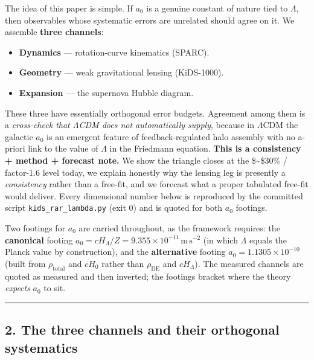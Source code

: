 \documentclass[
]{article}
\providecommand{\tightlist}{%
  \setlength{\itemsep}{0pt}\setlength{\parskip}{0pt}}
\begin{document}
The idea of this paper is simple. If \(a_0\) is a genuine constant of
nature tied to \(\Lambda\), then observables whose systematic errors are
unrelated should agree on it. We assemble \textbf{three channels}:

\begin{itemize}
\tightlist
\item
  \textbf{Dynamics} --- rotation-curve kinematics (SPARC).
\item
  \textbf{Geometry} --- weak gravitational lensing (KiDS-1000).
\item
  \textbf{Expansion} --- the supernova Hubble diagram.
\end{itemize}

These three have essentially orthogonal error budgets. Agreement among
them is a \emph{cross-check that \(\Lambda\)CDM does not automatically
supply}, because in \(\Lambda\)CDM the galactic \(a_0\) is an emergent
feature of feedback-regulated halo assembly with no a-priori link to the
value of \(\Lambda\) in the Friedmann equation. \textbf{This is a
consistency + method + forecast note.} We show the triangle closes at
the \$\sim\$30\% / factor-1.6 level today, we explain honestly why the
lensing leg is presently a \emph{consistency} rather than a free-fit,
and we forecast what a proper tabulated free-fit would deliver. Every
dimensional number below is reproduced by the committed script
\texttt{kids\_rar\_lambda.py} (exit 0) and is quoted for both \(a_0\)
footings.

Two footings for \(a_0\) are carried throughout, as the framework
requires: the \textbf{canonical} footing
\(a_0 = cH_\Lambda/Z = 9.355\times10^{-11}\,\mathrm{m\,s^{-2}}\) (in
which \(\Lambda\) equals the Planck value by construction), and the
\textbf{alternative} footing \(a_0 = 1.1305\times10^{-10}\) (built from
\(\rho_\mathrm{total}\) and \(cH_0\) rather than \(\rho_\mathrm{DE}\) and
\(cH_\Lambda\)). The measured channels are quoted as measured and then
inverted; the footings bracket where the theory \emph{expects} \(a_0\)
to sit.

\begin{center}\rule{0.5\linewidth}{0.5pt}\end{center}

\subsection{2. The three channels and their orthogonal
systematics}\label{the-three-channels-and-their-orthogonal-systematics}
\end{document}

